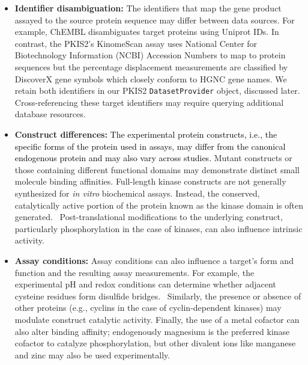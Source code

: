 \documentclass[9pt,lessons]{livecoms}
\newcommand{\revision}[1]{\textcolor{black}{#1}}
\begin{document}
\begin{itemize}
\item {\bf Identifier disambiguation:} The identifiers that map the gene product assayed to the source protein sequence may differ between data sources. For example, ChEMBL disambiguates target proteins using Uniprot IDs. In contrast, the PKIS2's KinomeScan assay uses National Center for Biotechnology Information (NCBI) Accession Numbers to map to protein sequences but the percentage displacement measurements are classified by DiscoverX gene symbols which closely conform to HGNC gene names. We retain both identifiers in our PKIS2 \texttt{DatasetProvider} object, discussed later. Cross-referencing these target identifiers may require querying additional database resources. 
\item {\bf Construct differences:} \revision{The experimental protein constructs, i.e., the specific forms of the protein used in assays, may differ from the canonical endogenous protein and may also vary across studies.} Mutant constructs or those containing different functional domains may demonstrate distinct small molecule binding affinities. Full-length kinase constructs are not generally synthesized for \textit{in vitro} biochemical assays. Instead, the conserved, catalytically active portion of the protein known as the kinase domain is often generated.~\cite{diwanji2019full} Post-translational modifications to the underlying construct, particularly phosphorylation in the case of kinases, can also influence intrinsic activity.
\item {\bf Assay conditions:} Assay conditions can also influence a target's form and function and the resulting assay measurements. For example, the experimental pH and redox conditions can determine whether adjacent cysteine residues form disulfide bridges.~\cite{ruiz2022disulfide} Similarly, the presence or absence of other proteins (e.g., cyclins in the case of cyclin-dependent kinases) may modulate construct catalytic activity. Finally, the use of a metal cofactor can also alter binding affinity; endogenously magnesium is the preferred kinase cofactor to catalyze phosphorylation, but other divalent ions like manganese and zinc may also be used experimentally.~\cite{knape2017cofactor}
\end{itemize}
\end{document}

